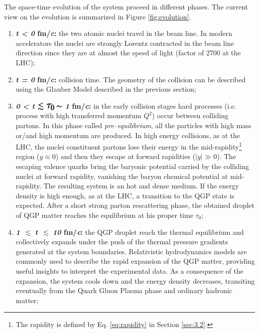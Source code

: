 The space-time evolution of the system proceed in different phases.
The current view on the evolution is summarized in Figure \ref{fig:evolution}.
\begin{enumerate}
    \item \textbf{\textit{t < 0} fm/\textit{c}:} the two atomic nuclei travel in the beam line. In modern accelerators
        the nuclei are strongly Lorentz contracted in the beam line direction since they are at almost the speed of 
        light (factor of 2700 at the LHC);

    \item \textbf{\textit{t = 0} fm/\textit{c}:} collision time. The geometry of the collision can be described using the Glauber Model described in the previous section;

    \item \textbf{\textit{0 < t}} $\, \pmb{\lesssim \, \text{\Large$ \tau_{0} $} \sim }$ \textbf{\textit{1} fm/\textit{c}:}
            in the early collision stages hard processes (i.e. process with high transferred momentum $Q^{2}$) occur between
            colliding partons. In this phase called \textit{pre–equilibrium}, all the particles with high mass or/and
            high momentum are produced. In high energy collisions, as at the LHC, the nuclei constituent partons 
            lose their energy in the mid-rapidity\footnote{The rapidity is defined by Eq. \ref{eq:rapidity} in Section 
            \ref{sec:3.2}.} region ($y\approx 0$) and then they escape at forward rapidities ($|y| \gg 0$). 
            The escaping valence quarks bring the baryonic potential carried by the colliding nuclei at forward rapidity,
            vanishing the baryon chemical potential at mid-rapidity.
            The resulting system is an hot and dense medium. If the energy density is high enough, as at the LHC, a 
            transition to the QGP state is expected.
            After a short strong parton rescattering phase, the obtained droplet of QGP matter reaches the equilibrium
            at his proper time $\tau_{0}$;
            
    \item \textbf{\textit{1}} $\, \pmb{\lesssim}$ \textbf{\textit{t}} $\, \pmb{\lesssim}$ \textbf{\textit{10} fm/\textit{c}:}
            the QGP droplet reach the thermal equilibrium and collectively expands under the push of the thermal pressure
            gradients generated at the system boundaries. Relativistic hydrodynamics models \cite{relhydro} are commonly 
            used to describe the rapid expansion of the QGP matter, providing useful insights to interpret the 
            experimental data.
            As a consequence of the expansion, the system cools down and the energy density decreases, transiting eventually
            from the Quark Gluon Plasma phase and ordinary hadronic matter;


\end{enumerate}
